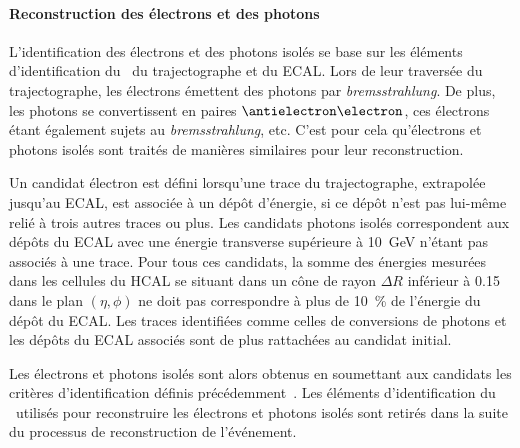 \paragraph{Reconstruction des électrons et des photons}
L'identification des électrons et des photons isolés se base sur les éléments d'identification du \PF\ du trajectographe et du ECAL.
Lors de leur traversée du trajectographe, les électrons émettent des photons par \emph{bremsstrahlung}.
De plus, les photons se convertissent en paires $\antielectron\electron$, ces électrons étant également sujets au \emph{bremsstrahlung}, etc.
C'est pour cela qu'électrons et photons isolés sont traités de manières similaires pour leur reconstruction.
\par Un candidat électron est défini lorsqu'une trace du trajectographe, extrapolée jusqu'au ECAL, est associée à un dépôt d'énergie, si ce dépôt n'est pas lui-même relié à trois autres traces ou plus.
Les candidats photons isolés correspondent aux dépôts du ECAL avec une énergie transverse supérieure à \SI{10}{\GeV} n'étant pas associés à une trace.
Pour tous ces candidats, la somme des énergies mesurées dans les cellules du HCAL se situant dans un cône de rayon $\Delta R$ inférieur à \num{0.15} dans le plan $(\eta,\phi)$ ne doit pas correspondre à plus de \SI{10}{\%} de l'énergie du dépôt du ECAL.
Les traces identifiées comme celles de conversions de photons et les dépôts du ECAL associés sont de plus rattachées au candidat initial.
\par Les électrons et photons isolés sont alors obtenus en soumettant aux candidats les critères d'identification définis précédemment~\cite{particle-flow}.
Les éléments d'identification du \PF\ utilisés pour reconstruire les électrons et photons isolés sont retirés dans la suite du processus de reconstruction de l'événement.
